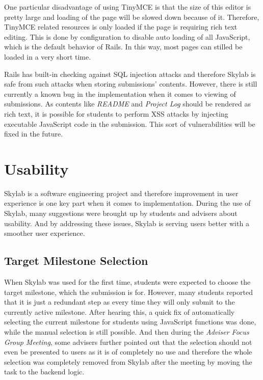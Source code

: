 One particular disadvantage of using TinyMCE is that the size of this editor is pretty large and loading of the page will be slowed down because of it. Therefore, TinyMCE related resources is only loaded if the page is requiring rich text editing. This is done by configuration to disable auto loading of all JavaScript, which is the default behavior of Rails. In this way, most pages can stilled be loaded in a very short time.

Rails has built-in checking against SQL injection attacks and therefore Skylab is safe from such attacks when storing submissions' contents\cite{citation11}. However, there is still currently a known bug in the implementation when it comes to viewing of submissions. As contents like \textit{README} and \textit{Project Log} should be rendered as rich text, it is possible for students to perform XSS attacks by injecting executable JavaScript code in the submission. This sort of vulnerabilities will be fixed in the future.

\section{Usability}

Skylab is a software engineering project and therefore improvement in user experience is one key part when it comes to implementation. During the use of Skylab, many suggestions were brought up by students and advisers about usability. And by addressing these issues, Skylab is serving users better with a smoother user experience.

\subsection{Target Milestone Selection}

When Skylab was used for the first time, students were expected to choose the target milestone, which the submission is for. However, many students reported that it is just a redundant step as every time they will only submit to the currently active milestone. After hearing this, a quick fix of automatically selecting the current milestone for students using JavaScript functions was done, while the manual selection is still possible. And then during the \textit{Adviser Focus Group Meeting}, some advisers further pointed out that the selection should not even be presented to users as it is of completely no use and therefore the whole selection was completely removed from Skylab after the meeting by moving the task to the backend logic. 

